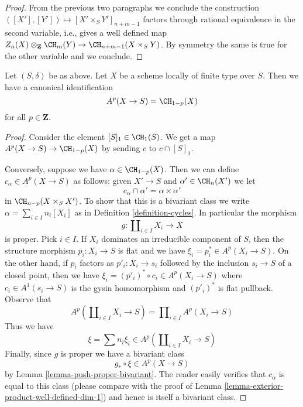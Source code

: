 \begin{proof}
\medskip\noindent
From the previous two paragraphs we conclude
the construction $([X'], [Y']) \mapsto [X' \times_S Y']_{n + m - 1}$
factors through rational equivalence in the second variable, i.e.,
gives a well defined map
$Z_n(X) \otimes_{\mathbf{Z}} \CH_m(Y) \to \CH_{n + m - 1}(X \times_S Y)$.
By symmetry the same is true for the other variable and we conclude.
\end{proof}

\begin{lemma}
\label{lemma-chow-cohomology-towards-base-dim-1}
Let $(S, \delta)$ be as above. Let $X$ be a scheme locally of finite type
over $S$. Then we have a canonical identification
$$
A^p(X \to S) = \CH_{1 - p}(X)
$$
for all $p \in \mathbf{Z}$.
\end{lemma}

\begin{proof}
Consider the element $[S]_1 \in \CH_1(S)$. We get a map
$A^p(X \to S) \to \CH_{1 - p}(X)$ by sending $c$ to $c \cap [S]_1$.

\medskip\noindent
Conversely, suppose we have $\alpha \in \CH_{1 - p}(X)$.
Then we can define $c_\alpha \in A^p(X \to S)$ as
follows: given $X' \to S$ and $\alpha' \in \CH_n(X')$
we let
$$
c_\alpha \cap \alpha' = \alpha \times \alpha'
$$
in $\CH_{n - p}(X \times_S X')$. To show that this is a bivariant
class we write $\alpha = \sum_{i \in I} n_i[X_i]$ as in
Definition \ref{definition-cycles}. In particular the morphism
$$
g : \coprod\nolimits_{i \in I} X_i \longrightarrow X
$$
is proper. Pick $i \in I$. If $X_i$ dominates an irreducible component
of $S$, then the structure morphism $p_i : X_i \to S$ is flat and we have
$\xi_i = p_i^* \in A^p(X_i \to S)$. On the other hand, if $p_i$ factors
as $p'_i : X_i \to s_i$ followed by the inclusion $s_i \to S$
of a closed point, then we have
$\xi_i = (p'_i)^* \circ c_i \in A^p(X_i \to S)$
where $c_i \in A^1(s_i \to S)$ is the gysin homomorphism and
$(p'_i)^*$ is flat pullback. Observe that
$$
A^p(\coprod\nolimits_{i \in I} X_i \to S) =
\prod\nolimits_{i \in I} A^p(X_i \to S)
$$
Thus we have
$$
\xi = \sum n_i \xi_i \in A^p(\coprod\nolimits_{i \in I} X_i \to S)
$$
Finally, since $g$ is proper we have a bivariant class
$$
g_* \circ \xi \in A^p(X \to S)
$$
by Lemma \ref{lemma-push-proper-bivariant}. The reader easily
verifies that $c_\alpha$ is equal to this class
(please compare with the proof of
Lemma \ref{lemma-exterior-product-well-defined-dim-1})
and hence is itself a bivariant class.


\end{proof}
